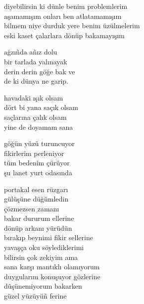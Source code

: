 \documentclass[10pt, openright, oneside]{memoir}
\theoremstyle{definition}
\begin{document}
\settowidth{\versewidth}{bilmem niye durduk yere benim üzülmelerim}
\begin{cverse}
  diyebilirsin ki dünle benim problemlerim \\
  aşamamışım onları ben atlatamamışım \\
  bilmem niye durduk yere benim üzülmelerim \\
  eski kaset çalarlara dönüp bakamayışım
\end{cverse}
\vspace*{\fill}
%
\newpage
{}
\vspace*{\fill}
\settowidth{\versewidth}{derin derin göğe bak ve}
\begin{cverse}
  ağzı\~nda a\~nız dolu  \\
  bir tarlada yalınayak  \\
  derin derin göğe bak ve \\
  de ki dünya ne garip.
\end{cverse}
\vspace*{\fill}
%
\newpage
{}
\vspace*{\fill}
\settowidth{\versewidth}{dört bi yana saçık olsam}
\begin{cverse}
  havadaki ışık olsam \\
  dört bi yana saçık olsam \\
  saçlarına çalık olsam \\
  yine de doyamam sana
\end{cverse}
\vspace*{\fill}
%
\newpage
{}
\vspace*{\fill}
\settowidth{\versewidth}{şu lanet yurt odasında}
\begin{cverse}
  göğün yüzü turuncuyor \\
  fikirlerim perleniyor \\
  tüm bedenim çürüyor \\
  şu lanet yurt odasında
\end{cverse}
\vspace*{\fill}
%
\newpage
{}
\vspace*{\fill}
\settowidth{\versewidth}{bırakıp beynimi fikir sellerine}
\begin{cverse}
  portakal esen rüzgarı \\
  gülüşüne düğümledin \\
  çözmezsen zamanı \\
  bakar dururum ellerine \\
  dönüp arkanı yürüdün \\
  bırakıp beynimi fikir sellerine \\
  yavaşça oku söylediklerimi \\
  bilirsin çok zekiyim ama \\
  sana karşı mantıklı olamıyorum \\
  duygularım konuşuyor gözlerine \\
  düşünemiyorum bakarken \\
  güzel yüzüyü\~n ferine
\end{cverse}
\end{document}

